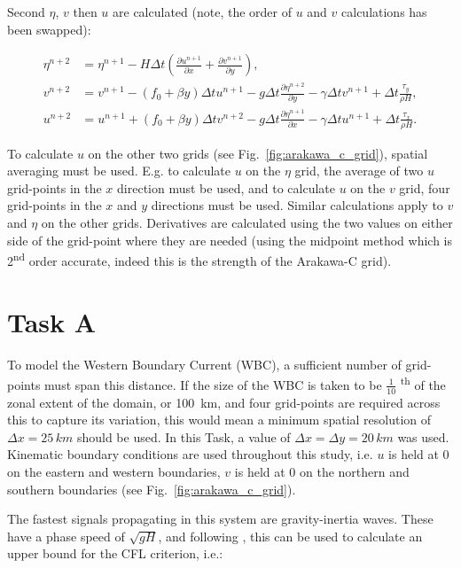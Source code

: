 \documentclass{article}
\newcommand{\ts}{\textsuperscript}
\begin{document}
Second $\eta$, $v$ then $u$ are calculated (note, the order of $u$ and $v$ calculations has been
swapped):

\begin{align}
    \label{eqn:swe_arakawa4} 
    \eta^{n+2} & =  \eta^{n+1}- H \Delta t (\frac{\partial u^{n+1}}{\partial x} + \frac{\partial
    v^{n+1}}{\partial y} ),  \\
    \label{eqn:swe_arakawa5} 
    v^{n+2} & = v^{n+1} - (f_0 + \beta y) \Delta t u^{n+1} - g \Delta t \frac{\partial \eta^{n+2}}{\partial y} -
    \gamma \Delta t v^{n+1} + \Delta t \frac{\tau_y}{\rho H}, \\
    \label{eqn:swe_arakawa6} 
    u^{n+2} & = u^{n+1} + (f_0 + \beta y) \Delta t v^{n+2} - g \Delta t \frac{\partial
	\eta^{n+1}}{\partial x} - \gamma \Delta t u^{n+1} + \Delta t \frac{\tau_x}{\rho H}.
\end{align}

To calculate $u$ on the other two grids (see Fig.\ \ref{fig:arakawa_c_grid}), spatial averaging must
be used. E.g. to calculate $u$ on the $\eta$ grid, the average of two $u$ grid-points in the $x$
direction must be used, and to calculate $u$ on the $v$ grid, four grid-points in the $x$ and $y$
directions must be used. Similar calculations apply to $v$ and $\eta$ on the other grids.
Derivatives are calculated using the two values on either side of the grid-point where they are
needed (using the midpoint method which is 2\ts{nd} order accurate, indeed this is the strength of
the Arakawa-C grid).

\section*{Task A}

To model the Western Boundary Current (WBC), a sufficient number of grid-points must span this
distance. If the size of the WBC is taken to be $\frac{1}{10}$ \ts{th} of the zonal extent of the
domain, or \SI{100}{km}, and four grid-points are required across this to capture its variation,
this would mean a minimum spatial resolution of $\Delta x = 25\, km$ should be used. In this Task, a
value of $\Delta x = \Delta y = 20\, km$ was used. Kinematic boundary conditions are used throughout
this study, i.e. $u$ is held at $0$ on the eastern and western boundaries, $v$ is held at $0$ on the
northern and southern boundaries (see Fig.\ \ref{fig:arakawa_c_grid}).

The fastest signals propagating in this system are gravity-inertia waves. These have a phase speed
of $\sqrt{g H}$, and following \textcite{beckers1993stability}, this can be used to calculate an
upper bound for the CFL criterion, i.e.:
\end{document}
